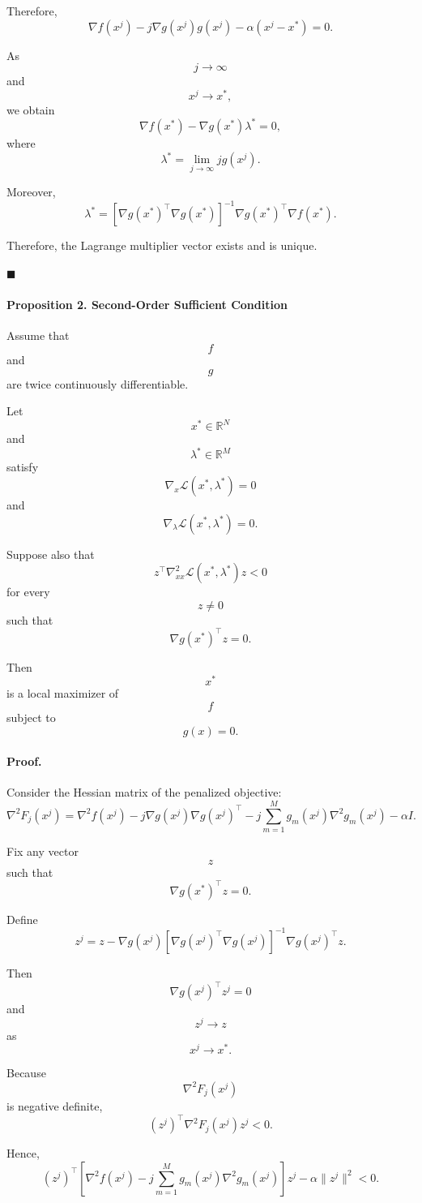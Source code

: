 Therefore,
\[
\nabla f(x^j)
-
j\nabla g(x^j)g(x^j)
-
\alpha(x^j-x^*)
=
0.
\]

As
\[
j\to\infty
\]
and
\[
x^j\to x^*,
\]
we obtain
\[
\nabla f(x^*)
-
\nabla g(x^*)
\lambda^*
=
0,
\]
where
\[
\lambda^*
=
\lim_{j\to\infty}jg(x^j).
\]

Moreover,
\[
\lambda^*
=
[\nabla g(x^*)^\top\nabla g(x^*)]^{-1}
\nabla g(x^*)^\top
\nabla f(x^*).
\]

Therefore, the Lagrange multiplier vector exists and is unique.

\hfill\(\blacksquare\)

\paragraph{Proposition 2. Second-Order Sufficient Condition}

Assume that
\[
f
\]
and
\[
g
\]
are twice continuously differentiable.

Let
\[
x^*\in\mathbb R^N
\]
and
\[
\lambda^*\in\mathbb R^M
\]
satisfy
\[
\nabla_x\mathcal L(x^*,\lambda^*)=0
\]
and
\[
\nabla_\lambda\mathcal L(x^*,\lambda^*)=0.
\]

Suppose also that
\[
z^\top
\nabla_{xx}^2\mathcal L(x^*,\lambda^*)
z
<
0
\]
for every
\[
z\neq0
\]
such that
\[
\nabla g(x^*)^\top z=0.
\]

Then
\[
x^*
\]
is a local maximizer of
\[
f
\]
subject to
\[
g(x)=0.
\]

\paragraph{Proof.}

Consider the Hessian matrix of the penalized objective:
\[
\nabla^2F_j(x^j)
=
\nabla^2f(x^j)
-
j\nabla g(x^j)\nabla g(x^j)^\top
-
j\sum_{m=1}^M
g_m(x^j)\nabla^2g_m(x^j)
-
\alpha I.
\]

Fix any vector
\[
z
\]
such that
\[
\nabla g(x^*)^\top z=0.
\]

Define
\[
z^j
=
z
-
\nabla g(x^j)
[
\nabla g(x^j)^\top
\nabla g(x^j)
]^{-1}
\nabla g(x^j)^\top z.
\]

Then
\[
\nabla g(x^j)^\top z^j=0
\]
and
\[
z^j\to z
\]
as
\[
x^j\to x^*.
\]

Because
\[
\nabla^2F_j(x^j)
\]
is negative definite,
\[
(z^j)^\top
\nabla^2F_j(x^j)
z^j
<
0.
\]

Hence,
\[
(z^j)^\top
\left[
\nabla^2f(x^j)
-
j\sum_{m=1}^M
g_m(x^j)\nabla^2g_m(x^j)
\right]
z^j
-
\alpha\|z^j\|^2
<
0.
\]

